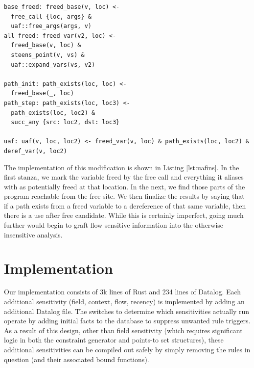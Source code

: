 \begin{lstlisting}[label=lst:uafins, caption={Tracking Frees Insensitively}]
base_freed: freed_base(v, loc) <-
  free_call {loc, args} &
  uaf::free_args(args, v)
all_freed: freed_var(v2, loc) <-
  freed_base(v, loc) &
  steens_point(v, vs) &
  uaf::expand_vars(vs, v2)

path_init: path_exists(loc, loc) <-
  freed_base(_, loc)
path_step: path_exists(loc, loc3) <-
  path_exists(loc, loc2) &
  succ_any {src: loc2, dst: loc3}

uaf: uaf(v, loc, loc2) <- freed_var(v, loc) & path_exists(loc, loc2) & deref_var(v, loc2)
\end{lstlisting}

The implementation of this modification is shown in Listing \ref{lst:uafins}.
In the first stanza, we mark the variable freed by the free call and everything it aliases with as potentially freed at that location.
In the next, we find those parts of the program reachable from the free site.
We then finalize the results by saying that if a path exists from a freed variable to a dereference of that same variable, then there is a use after free candidate.
While this is certainly imperfect, going much further would begin to graft flow sensitive information into the otherwise insensitive analysis.

\section{Implementation}
\label{alias:sec:impl}
Our implementation consists of 3k lines of Rust and 234 lines of Datalog.
Each additional sensitivity (field, context, flow, recency) is implemented by adding an additional Datalog file.
The switches to determine which sensitivities actually run operate by adding initial facts to the database to suppress unwanted rule triggers.
As a result of this design, other than field sensitivity (which requires significant logic in both the constraint generator and points-to set structures), these additional sensitivities can be compiled out safely by simply removing the rules in question (and their associated bound functions).

